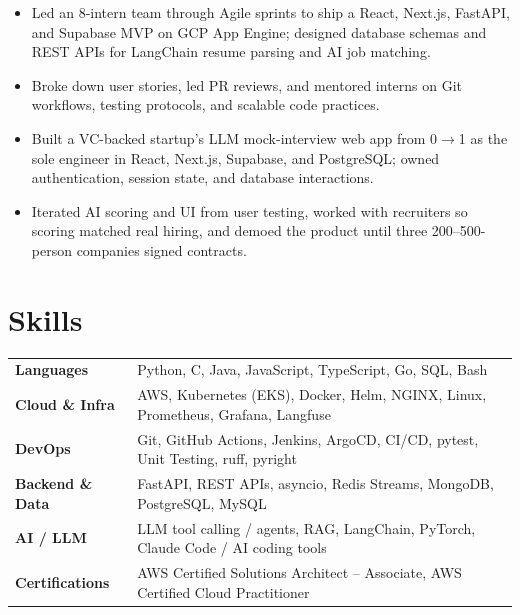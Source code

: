 \documentclass[11pt, letterpaper]{article}
\begin{document}
\begin{itemize}
  \item Led an 8-intern team through Agile sprints to ship a React, Next.js, FastAPI, and Supabase MVP on GCP App Engine; designed database schemas and REST APIs for LangChain resume parsing and AI job matching.
  \item Broke down user stories, led PR reviews, and mentored interns on Git workflows, testing protocols, and scalable code practices.
\end{itemize}

\begin{itemize}
  \item Built a VC-backed startup's LLM mock-interview web app from 0$\to$1 as the sole engineer in React, Next.js, Supabase, and PostgreSQL; owned authentication, session state, and database interactions.
  \item Iterated AI scoring and UI from user testing, worked with recruiters so scoring matched real hiring, and demoed the product until three 200--500-person companies signed contracts.
\end{itemize}

\section{Skills}
\begin{tabularx}{\textwidth}{@{}l @{\hspace{7pt}} >{\raggedright\arraybackslash}X@{}}
  \textbf{Languages} & Python, C, Java, JavaScript, TypeScript, Go, SQL, Bash \\[1pt]
  \textbf{Cloud \& Infra} & AWS, Kubernetes (EKS), Docker, Helm, NGINX, Linux, Prometheus, Grafana, Langfuse \\[1pt]
  \textbf{DevOps} & Git, GitHub Actions, Jenkins, ArgoCD, CI/CD, pytest, Unit Testing, ruff, pyright \\[1pt]
  \textbf{Backend \& Data} & FastAPI, REST APIs, asyncio, Redis Streams, MongoDB, PostgreSQL, MySQL \\[1pt]
  \textbf{AI / LLM} & LLM tool calling / agents, RAG, LangChain, PyTorch, Claude Code / AI coding tools \\[1pt]
  \textbf{Certifications} & AWS Certified Solutions Architect -- Associate, AWS Certified Cloud Practitioner \\
\end{tabularx}
\end{document}
